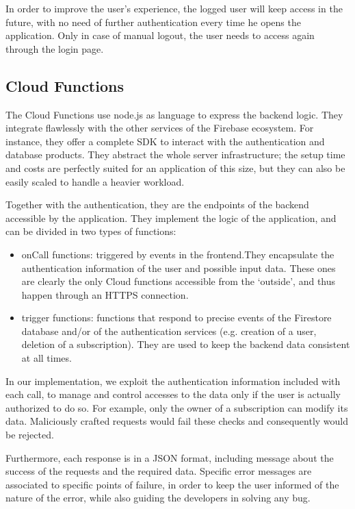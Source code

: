 \documentclass[11pt]{article}
\begin{document}
In order to improve the user's experience, the logged user will keep access in the future, with no need of further authentication every time he opens the application. Only in case of manual logout, the user needs to access again through the login page.

\subsection{Cloud Functions}
The Cloud Functions use node.js as language to express the backend logic.
They integrate flawlessly with the other services of the Firebase ecosystem. For instance, they offer a complete SDK to interact with the authentication and database products. They abstract the whole server infrastructure; the setup time and costs are perfectly suited for an application of this size, but they can also be easily scaled to handle a heavier workload.

Together with the authentication, they are the endpoints of the backend accessible by the application. They implement the logic of the application, and can be divided in two types of functions: \begin{itemize}
    \item onCall functions: triggered by events in the frontend.They encapsulate the authentication information of the user and possible input data. These ones are clearly the only Cloud functions accessible from the `outside', and thus happen through an HTTPS connection.
    \item trigger functions: functions that respond to precise events of the Firestore database and/or of the authentication services (e.g. creation of a user, deletion of a subscription). They are used to keep the backend data consistent at all times.
\end{itemize}

In our implementation, we exploit the authentication information included with each call, to manage and control accesses to the data only if the user is actually authorized to do so. For example, only the owner of a subscription can modify its data. Maliciously crafted requests would fail these checks and consequently would be rejected.

Furthermore, each response is in a JSON format, including message about the success of the requests and the required data. Specific error messages are associated to specific points of failure, in order to keep the user informed of the nature of the error, while also guiding the developers in solving any bug.
\end{document}
